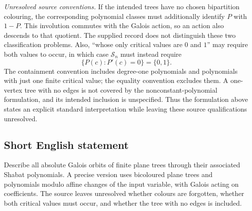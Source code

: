 \documentclass[11pt]{article}
\begin{document}
\emph{Unresolved source conventions.} If the intended trees have no chosen bipartition colouring, the corresponding polynomial classes must additionally identify \(P\) with \(1-P\). This involution commutes with the Galois action, so an action also descends to that quotient. The supplied record does not distinguish these two classification problems. Also, ``whose only critical values are \(0\) and \(1\)'' may require both values to occur, in which case \(\mathcal S_n\) must instead require
\[
\{P(c):P'(c)=0\}=\{0,1\}.
\]
The containment convention includes degree-one polynomials and polynomials with just one finite critical value; the equality convention excludes them. A one-vertex tree with no edges is not covered by the nonconstant-polynomial formulation, and its intended inclusion is unspecified. Thus the formulation above states an explicit standard interpretation while leaving these source qualifications unresolved.
\subsection{Short English statement}
Describe all absolute Galois orbits of finite plane trees through their associated Shabat polynomials. A precise version uses bicoloured plane trees and polynomials modulo affine changes of the input variable, with Galois acting on coefficients. The source leaves unresolved whether colours are forgotten, whether both critical values must occur, and whether the tree with no edges is included.
\end{document}
